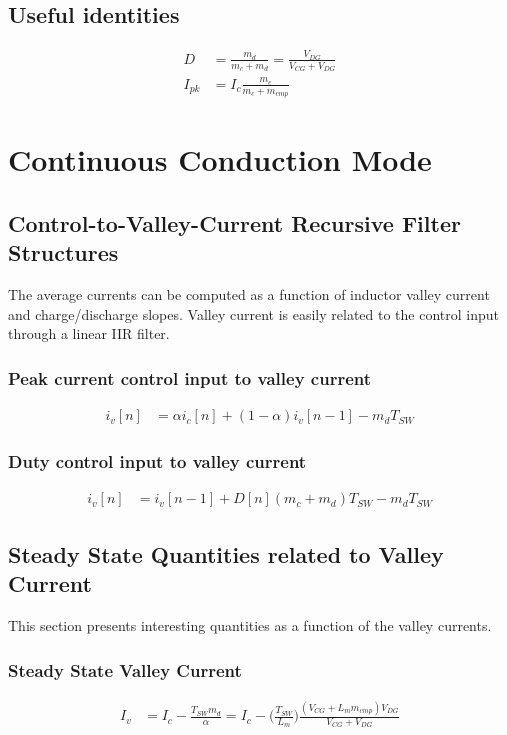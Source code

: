 \documentclass{scrartcl}
\begin{document}
			\subsection{Useful identities}
			\begin{align}
				D &= \frac{m_d}{m_c + m_d} = \frac{V_{DG}}{V_{CG}+V_{DG}} \label{duty_general}\\
				I_{pk} &= I_c\frac{m_c}{m_c+m_{cmp}} \label{control_to_peak_general}
			\end{align}

	\section{Continuous Conduction Mode}
		\subsection{Control-to-Valley-Current Recursive Filter Structures}
		The average currents can be computed as a function of inductor valley current and charge/discharge slopes.  Valley current is easily related to the control input through a linear IIR filter.
		\subsubsection{Peak current control input to valley current}
			\begin{align}
			i_v[n] &=  \alpha i_c[n] + ( 1 - \alpha ) i_v [n-1] - m_dT_{SW}    \label{ivn_cpm}
			\end{align}
		
		\subsubsection{Duty control input to valley current}
			\begin{align}
			i_v[n] &= i_v[n-1] +  D[n](m_c+m_d)T_{SW} - m_dT_{SW}  \label{ivn_dc}	
			\end{align}		
		

	\subsection{Steady State Quantities related to Valley Current}
	This section presents interesting quantities as a function of the valley currents.
	
		\subsubsection{Steady State Valley Current}
			\begin{align}
			I_{v} &=  I_{c} - \frac{T_{SW}m_d} {\alpha} =
			I_c - \bigg(\frac{T_{SW}} {L_m}\bigg) \frac{(V_{CG}+L_m m_{cmp})V_{DG} }{V_{CG}+V_{DG}} \label{ic_to_iv}
			\end{align}
			
\end{document}
